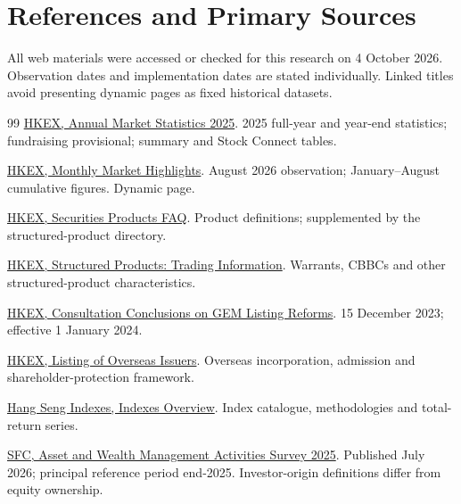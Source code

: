 \documentclass[11pt,a4paper]{article}
\begin{document}
\section*{References and Primary Sources}
All web materials were accessed or checked for this research on 4 October 2026. Observation dates and implementation dates are stated individually. Linked titles avoid presenting dynamic pages as fixed historical datasets.
\begin{thebibliography}{99}
\small
{} \href{https://www.hkex.com.hk/Market-Data/Statistics/Consolidated-Reports/Annual-Market-Statistics/2025-Annual-Market-Statistics?sc_lang=en}{HKEX, Annual Market Statistics 2025}. 2025 full-year and year-end statistics; fundraising provisional; summary and Stock Connect tables.

 \href{https://www.hkex.com.hk/Market-Data/Statistics/Consolidated-Reports/HKEX-Monthly-Market-Highlights?sc_lang=en}{HKEX, Monthly Market Highlights}. August 2026 observation; January--August cumulative figures. Dynamic page.

 \href{https://www.hkex.com.hk/Global/Exchange/FAQ/Products/Securities?sc_lang=en}{HKEX, Securities Products FAQ}. Product definitions; supplemented by the structured-product directory.

 \href{https://www.hkex.com.hk/Products/Securities/Structured-Products/Trading-Information-and-Historical-Data?sc_lang=en}{HKEX, Structured Products: Trading Information}. Warrants, CBBCs and other structured-product characteristics.

 \href{https://www.hkex.com.hk/News/Regulatory-Announcements/2023/2312152news?sc_lang=en}{HKEX, Consultation Conclusions on GEM Listing Reforms}. 15 December 2023; effective 1 January 2024.

 \href{https://www.hkex.com.hk/Listing/Rules-and-Resources/Guidance/IPO/Listing-of-Overseas-Companies?sc_lang=en}{HKEX, Listing of Overseas Issuers}. Overseas incorporation, admission and shareholder-protection framework.

 \href{https://www.hsi.com.hk/en-hk/indexes/}{Hang Seng Indexes, Indexes Overview}. Index catalogue, methodologies and total-return series.

 \href{https://www.sfc.hk/-/media/EN/files/COM/Reports-and-surveys/AWMAS-report-English.pdf?hash=2FD55F1DF15EDBEBC0375F08B63CA0B9&rev=355c352ea18b409f8bef3388ae259d7f}{SFC, Asset and Wealth Management Activities Survey 2025}. Published July 2026; principal reference period end-2025. Investor-origin definitions differ from equity ownership.


\end{thebibliography}
\end{document}
